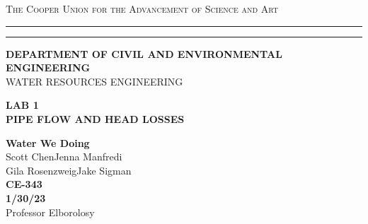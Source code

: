 \begin{titlepage}
    \begin{center}
    {{\Large{\textsc{The Cooper Union for the Advancement of Science and Art}}}} \rule[0.1cm]{15.8cm}{0.1mm}
    \rule[0.5cm]{15.8cm}{0.6mm}
    {\small{\bf DEPARTMENT OF CIVIL AND ENVIRONMENTAL ENGINEERING}}\\
    {\footnotesize{WATER RESOURCES ENGINEERING}}
    \end{center}
    \vspace{15mm}
    \begin{center}
    {\large{\bf LAB 1\\}}
    \vspace{5mm}
    {\Large{\bf PIPE FLOW AND HEAD LOSSES}}
    \end{center}
    \vspace{35mm}
    \par
    \noindent
    \hfill
    \vspace{20mm}
    \begin{center}
    {\large{ {\bf Water We Doing} \\ { Scott Chen\hspace{5mm}Jenna Manfredi\\Gila Rosenzweig\hspace{5mm}Jake Sigman}}}
    \vspace{40mm}
    {\large {\bf \\CE-343 \\ 1/30/23 \\}}
    \vspace{15mm}
    {\normalsize{Professor Elborolosy}}
    \end{center}
\end{titlepage}